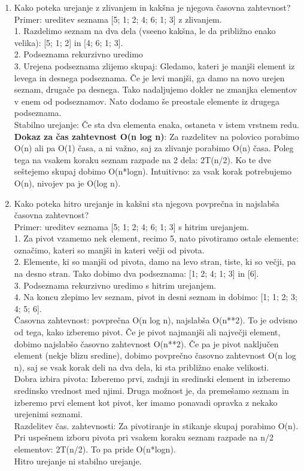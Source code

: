 \documentclass[a4paper]{article}
\begin{document}
\begin{enumerate}
        \item Kako poteka urejanje z zlivanjem in kakšna je njegova časovna zahtevnost?\\
        Primer: ureditev seznama [5; 1; 2; 4; 6; 1; 3] z zlivanjem.\\
        1. Razdelimo seznam na dva dela (vseeno kakšna, le da približno enako velika): [5; 1; 2] in [4; 6; 1; 3].\\
        2. Podseznama rekurzivno uredimo\\
        3. Urejena podseznama zlijemo skupaj: Gledamo, kateri je manjši element iz levega in desnega podseznama. Če je levi manjši, ga damo na novo urejen seznam, drugače pa desnega. Tako nadaljujemo dokler ne zmanjka elementov v enem od podseznamov. Nato dodamo še preostale elemente iz drugega podseznama.\\
        Stabilno urejanje: Če sta dva elementa enaka, ostaneta v istem vrstnem redu.
        \textbf{Dokaz za čas zahtevnost O(n log n)}: Za razdelitev na polovico porabimo O(n) ali pa O(1) časa, a ni važno, saj za zlivanje porabimo O(n) časa. Poleg tega na vsakem koraku seznam razpade na 2 dela: 2T(n/2). Ko te dve seštejemo skupaj dobimo O(n*logn). Intuitivno: za vsak korak potrebujemo O(n), nivojev pa je O(log n).


        \item Kako poteka hitro urejanje in kakšni sta njegova povprečna in najslabša časovna zahtevnost?\\
        Primer: ureditev seznama [5; 1; 2; 4; 6; 1; 3] s hitrim urejanjem.\\
        1. Za pivot vzamemo nek element, recimo 5, nato pivotiramo ostale elemente: označimo, kateri so manjši in kateri večji od pivota.\\
        2. Elemente, ki so manjši od pivota, damo na levo stran, tiste, ki so večji, pa na desno stran. Tako dobimo dva podseznama: [1; 2; 4; 1; 3] in [6].\\
        3. Podseznama rekurzivno uredimo s hitrim urejanjem.\\
        4. Na koncu zlepimo lev seznam, pivot in desni seznam in dobimo: [1; 1; 2; 3; 4; 5; 6].\\
        Časovna zahtevnost: povprečna O(n log n), najslabša O(n**2). To je odvisno od tega, kako izberemo pivot. Če je pivot najmanjši ali največji element, dobimo najslabšo časovno zahtevnost O(n**2). Če pa je pivot naključen element (nekje blizu sredine), dobimo povprečno časovno zahtevnost O(n log n), saj se vsak korak deli na dva dela, ki sta približno enake velikosti.\\
        Dobra izbira pivota: Izberemo prvi, zadnji in sredinski element in izberemo sredinsko vrednost med njimi. Druga možnost je, da premešamo seznam in izberemo prvi element kot pivot, ker imamo ponavadi opravka z nekako urejenimi seznami.\\
        Razdelitev čas. zahtevnosti: Za pivotiranje in stikanje skupaj porabimo O(n). Pri uspešnem izboru pivota pri vsakem koraku seznam razpade na n/2 elementov: 2T(n/2). To pa pride O(n*logn).\\
        Hitro urejanje ni stabilno urejanje.


\end{enumerate}
\end{document}

